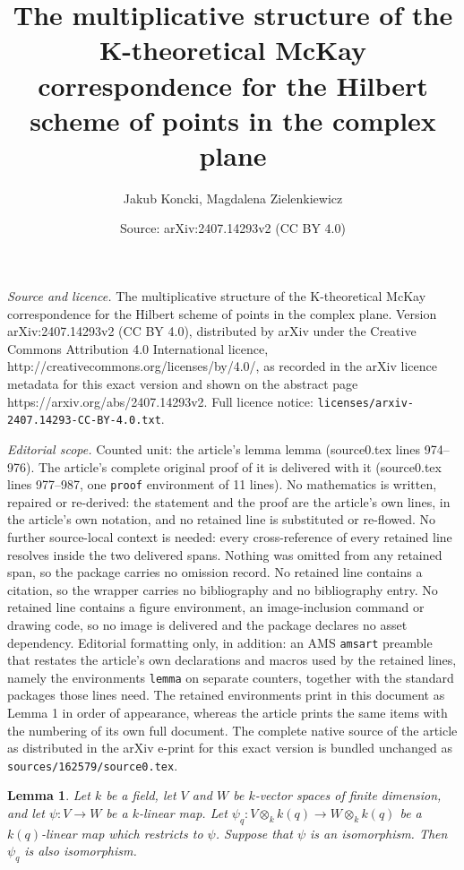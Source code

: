 \documentclass[10pt,a4paper]{amsart}
\title{The multiplicative structure of the K-theoretical McKay correspondence for the Hilbert scheme of points in the complex plane}
\author{Jakub Koncki, Magdalena Zielenkiewicz}
\date{Source: arXiv:2407.14293v2 (CC BY 4.0)}
\newtheorem{lemma}{Lemma}
\begin{document}
\maketitle

\noindent\emph{Source and licence.} The multiplicative structure of the K-theoretical McKay correspondence for the Hilbert scheme of points in the complex plane. Version arXiv:2407.14293v2 (CC BY 4.0), distributed by arXiv under the Creative Commons Attribution 4.0 International licence, http://creativecommons.org/licenses/by/4.0/, as recorded in the arXiv licence metadata for this exact version and shown on the abstract page https://arxiv.org/abs/2407.14293v2. Full licence notice: \texttt{licenses/arxiv-2407.14293-CC-BY-4.0.txt}.\par\smallskip

\noindent\textit{Editorial scope.} Counted unit: the article's lemma lemma (source0.tex lines 974--976). The article's complete original proof of it is delivered with it (source0.tex lines 977--987, one \texttt{proof} environment of 11 lines). No mathematics is written, repaired or re-derived: the statement and the proof are the article's own lines, in the article's own notation, and no retained line is substituted or re-flowed.  No further source-local context is needed: every cross-reference of every retained line resolves inside the two delivered spans.  Nothing was omitted from any retained span, so the package carries no omission record.  No retained line contains a citation, so the wrapper carries no bibliography and no bibliography entry.  No retained line contains a figure environment, an image-inclusion command or drawing code, so no image is delivered and the package declares no asset dependency.  Editorial formatting only, in addition: an AMS \texttt{amsart} preamble that restates the article's own declarations and macros used by the retained lines, namely the environments \texttt{lemma} on separate counters, together with the standard packages those lines need.  The retained environments print in this document as Lemma 1 in order of appearance, whereas the article prints the same items with the numbering of its own full document.  The complete native source of the article as distributed in the arXiv e-print for this exact version is bundled unchanged as \texttt{sources/162579/source0.tex}.
\begin{lemma}
	Let $k$ be a field, let $V$ and $W$ be $k$-vector spaces of finite dimension, and let \hbox{$\psi:V\to W$} be a $k$-linear map. Let $\psi_q:V\otimes_k k(q)\to W\otimes_k k(q)$ be a $k(q)$-linear map which restricts to $\psi$. Suppose that $\psi$ is an isomorphism. Then $\psi_q$ is also isomorphism.
\end{lemma}
\end{document}
